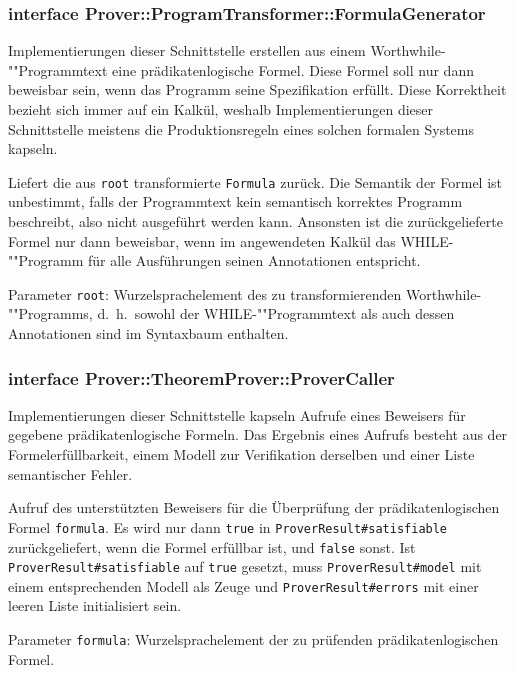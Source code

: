 \subsubsection{interface Prover::ProgramTransformer::FormulaGenerator}%

Implementierungen dieser Schnittstelle erstellen aus einem
Worthwhile-""Programmtext eine prädikatenlogische Formel. Diese Formel
soll nur dann beweisbar sein, wenn das Programm seine Spezifikation
erfüllt. Diese Korrektheit bezieht sich immer auf ein Kalkül, weshalb
Implementierungen dieser Schnittstelle meistens die Produktionsregeln
eines solchen formalen Systems kapseln.%

\begin{description}%

    Liefert die aus \texttt{root} transformierte \texttt{Formula}
    zurück. Die Semantik der Formel ist unbestimmt, falls der
    Programmtext kein semantisch korrektes Programm beschreibt, also
    nicht ausgeführt werden kann. Ansonsten ist die zurückgelieferte
    Formel nur dann beweisbar, wenn im angewendeten Kalkül das
    WHILE-""Programm für alle Ausführungen seinen Annotationen
    entspricht.%

    Parameter \texttt{root}: Wurzelsprachelement des zu
    transformierenden Worthwhile-""Programms, d.~h.\ sowohl der
    WHILE-""Programmtext als auch dessen Annotationen sind im
    Syntaxbaum enthalten.%

\end{description}%

\subsubsection{interface Prover::TheoremProver::ProverCaller}%

Implementierungen dieser Schnittstelle kapseln Aufrufe eines Beweisers
für gegebene prädikatenlogische Formeln. Das Ergebnis eines Aufrufs
besteht aus der Formelerfüllbarkeit, einem Modell zur Verifikation
derselben und einer Liste semantischer Fehler.%

\begin{description}%

    Aufruf des unterstützten Beweisers für die Überprüfung der
    prädikatenlogischen Formel \texttt{formula}. Es wird nur dann
    \texttt{true} in \texttt{ProverResult\#satisfiable}
    zurückgeliefert, wenn die Formel erfüllbar ist, und \texttt{false}
    sonst. Ist \texttt{ProverResult\#satisfiable} auf \texttt{true}
    gesetzt, muss \texttt{ProverResult\#model} mit einem
    entsprechenden Modell als Zeuge und \texttt{ProverResult\#errors}
    mit einer leeren Liste initialisiert sein.%

    Parameter \texttt{formula}: Wurzelsprachelement der zu prüfenden
    prädikatenlogischen Formel.%

\end{description}%

